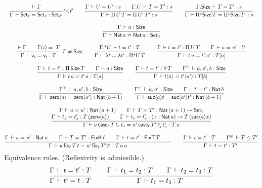 \documentclass[acmlarge,review,anonymous]{acmart}\settopmatter{printfolios=true}
\begin{document}
\begin{gather*}
  \ru{\der \Gamma
    }{\Gamma \der \Set[\ell] = \Set[\ell]: \Set[\ell']
    }{\ell {<} \ell'}
\qquad
  \ru{\Gamma \der U = U' : s \qquad
      \cext \Gamma U \der T = T' : s
    }{\Gamma \der \piT U T = \piT{U'}{T'}: s}
\qquad
  \ru{\cext \Gamma \Size \der T = T' : s
    }{\Gamma \der \epiT \Size T = \epiT \Size T' : s}
\\[2ex]
  \ru{%
      \Gamma \der a : \Size
    }{\Gamma \der \Nat a = \Nat a : \Set[0]}
\\[2ex]
  \rux{\der \Gamma \qquad \Gamma(i) = \erann[\noterased] T
    }{\Gamma \der \ind i = \ind i : T
    }{T \not= \Size}
\qquad
  \ru{\eext \Gamma U \der t = t' : T
    }{\Gamma \der \lambda t = \lambda t' : \epiT U T}
\qquad
  \ru{\Gamma \der t = t' : \piT U T \qquad
      \Gamma \der u = u' : U
    }{\Gamma \der t\,u = t'\,u' : T[u]}
\\[2ex]
  \ru{\Gamma \der t = t' : \piT \Size T \qquad
      \Gamma \der a : \Size
    }{\Gamma \der t\,a = t'\,a : T[a]}
\qquad
  \ru{\Gamma \der t = t' : \forallT T \qquad
      \resurrect\Gamma \der a,a',b : \Size
    }{\Gamma \der t \ann a = t' \ann{a'} : T[b]}
\\[2ex] %
  \ru{%
      \resurrect\Gamma \der a, a', b : \Size
    }{\Gamma \der \zero a = \zero {a'}: \Nat (b + 1)}
\qquad
  \ru{\resurrect \Gamma \der a, a' : \Size \qquad
      \Gamma \der t = t' : \Nat b
    }{\Gamma \der \suc a t = \suc {a'} t' : \Nat (b + 1)}
\\[2ex]
  \ru{\Gamma \der u = u' : \Nat (a + 1) \qquad
      \Gamma \der T = T' : \Nat (a + 1) \to \Set[\ell] \\
      \Gamma \der t_z = t_z' : T \, (\zero a) \qquad
      \Gamma \der t_s = t_s' : (x : \Nat a) \to T \, (\suc a x)
    }{\Gamma \der u\,\case[\ell] T {t_z} t_s = u'\,\case[\ell] {T'} {t_z'} t_s' : T \, u}
\\[2ex]
  \ru{\Gamma \der u = u' : \Nat a \qquad
      \Gamma \der T = T' : \FixK\,\ell \qquad %
      \Gamma \der t = t' : \FixT\,T \qquad %
     }{\Gamma \der u\,\fix[\ell] T t = u'\,\fix[\ell] {T'} t' : T \, a \, u}
\qquad
  \ru{\Gamma \der t = t' : T \qquad
      \resurrect\Gamma \der T \leq T'
     }{\Gamma \der t = t' : T'}
\end{gather*}
Equivalence rules.  (Reflexivity is admissible.)
\begin{gather*}
  \ru{\Gamma \der t = t' : T
    }{\Gamma \der t' = t : T}
\qquad
  \ru{\Gamma \der t_1 = t_2 : T \qquad
      \Gamma \der t_2 = t_3 : T
    }{\Gamma \der t_1 = t_3 : T}
\end{gather*}
\end{document}
